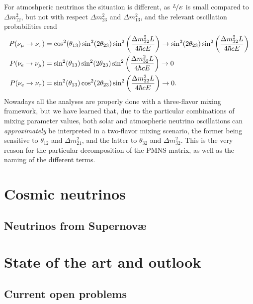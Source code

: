 For atmoshperic neutrinos the situation is different, as $\nicefrac{L}{E}$ is
small compared to $\Delta m^2_{12}$, but not with respect $\Delta m^2_{23}$ and
$\Delta m^2_{13}$, and the relevant oscillation probabilities read
\begin{align*}
  P(\nu_\mu \rightarrow \nu_\tau) & =
  \cos^2(\theta_{13})\sin^2(2\theta_{23})\sin^2\qty(\frac{\Delta m^2_{32} L}{4\hbar c E})
  \rightarrow \sin^2(2\theta_{23})\sin^2\qty(\frac{\Delta m^2_{32} L}{4\hbar c E})\\
  P(\nu_e \rightarrow \nu_\mu) & =
  \sin^2(\theta_{13})\sin^2(2\theta_{23})\sin^2\qty(\frac{\Delta m^2_{32} L}{4\hbar c E})
  \rightarrow 0\\
  P(\nu_e \rightarrow \nu_\tau) & =
  \sin^2(\theta_{13})\cos^2(2\theta_{23})\sin^2\qty(\frac{\Delta m^2_{32} L}{4\hbar c E})
  \rightarrow 0.
\end{align*}
Nowadays all the analyses are properly done with a three-flavor mixing framework,
but we have learned that, due to the particular combinations of mixing parameter
values, both solar and atmospheric neutrino oscillations can \emph{approximately}
be interpreted in a two-flavor mixing scenario, the former being sensitive to
$\theta_{12}$ and $\Delta m^2_{21}$, and the latter to $\theta_{32}$ and $\Delta m^2_{32}$.
This is the very reason for the particular decomposition of the PMNS matrix, as
well as the naming of the different terms.


\section{Cosmic neutrinos}


\subsection{Neutrinos from Supernov\ae}


\section{State of the art and outlook}




\subsection{Current open problems}
